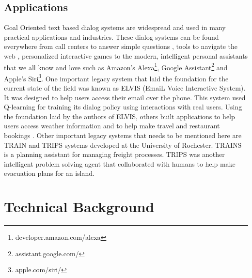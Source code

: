 \documentclass[14pt]{extarticle}
\numberwithin{equation}{section}
\begin{document}
	\subsection{Applications}
	Goal Oriented text based dialog systems are widespread and used in many practical applications and industries. These dialog systems can be found everywhere from call centers to answer simple questions \cite{georgila1998integrated}, tools to navigate the web \cite{chai2001natural}, personalized interactive games\cite{su2013dialoguegame} to the modern, intelligent personal assistants that we all know and love such as Amazon's Alexa\footnote{developer.amazon.com/alexa}, Google Assistant\footnote{assistant.google.com/} and Apple's Siri\footnote{apple.com/siri/}. One important legacy system that laid the foundation for the current state of the field was known as ELVIS (EmaiL Voice Interactive System). It was designed to help users access their email over the phone\cite{ELVIS}. This system used Q-learning for training its dialog policy using interactions with real users. Using the foundation laid by the authors of ELVIS, others built applications to help users access weather information \cite{zue_jupiter} and to help make travel and restaurant bookings \cite{Shriver_unified}. Other important legacy systems that needs to be mentioned here are TRAIN\cite{TRAIN} and TRIPS\cite{ferguson1998trips} systems developed at the University of Rochester. TRAINS is a planning assistant for managing freight processes. TRIPS was another intelligent problem solving agent that collaborated with humans to help make evacuation plans for an island.
	
	\pagebreak
	\section{Technical Background}
\end{document}
